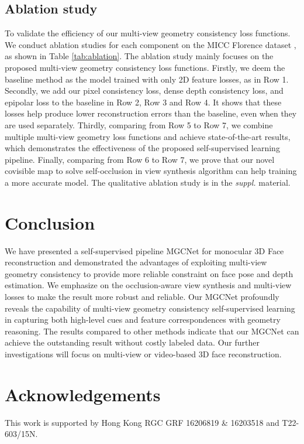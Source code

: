 \documentclass[runningheads]{llncs}
\begin{document}
\subsection{Ablation study} \label{sec_abla}
To validate the efficiency of our multi-view geometry consistency loss functions.
We conduct ablation studies for each component on the MICC Florence dataset \cite{dataset_florence}, as shown in Table \ref{tab:ablation}.
The ablation study mainly focuses on the proposed multi-view geometry consistency loss functions. 
Firstly, we deem the baseline method as the model trained with only 2D feature losses, as in Row 1.
Secondly, we add our pixel consistency loss, dense depth consistency loss, and epipolar loss to the baseline in Row 2, Row 3 and Row 4.
It shows that these losses help produce lower reconstruction errors than the baseline, even when they are used separately.
Thirdly, comparing from Row 5 to Row 7, we combine multiple multi-view geometry loss functions and achieve state-of-the-art results, which demonstrates the effectiveness of the proposed self-supervised learning pipeline.
Finally, comparing from Row 6 to Row 7, we prove that our novel covisible map to solve self-occlusion in view synthesis algorithm can help training a more accurate model.
The qualitative ablation study is in the \textit{suppl.} material.
 \section{Conclusion}
We have presented a self-supervised pipeline MGCNet for monocular 3D Face reconstruction and demonstrated the advantages of exploiting multi-view geometry consistency to provide more reliable constraint on face pose and depth estimation.
We emphasize on the occlusion-aware view synthesis and multi-view losses to make the result more robust and reliable. 
Our MGCNet profoundly reveals the capability of multi-view geometry consistency self-supervised learning in capturing both high-level cues and feature correspondences with geometry reasoning.
The results compared to other methods indicate that our MGCNet can achieve the outstanding result without costly labeled data.
Our further investigations will focus on multi-view or video-based 3D face reconstruction.
\section{Acknowledgements}
This work is supported by Hong Kong RGC GRF 16206819 \& 16203518 and T22-603/15N.
\begin{comment}
\noindent
\textbf{Acknowledgements}
This work is supported by Hong Kong RGC GRF 16206819 \& 16203518 and T22-603/15N.
\end{comment}


\let\cleardoublepage\clearpage
\end{document}

